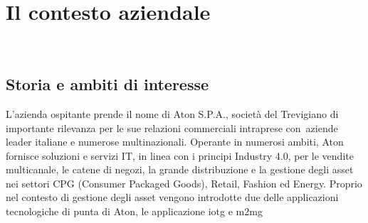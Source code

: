 
\chapter{Il contesto aziendale}
\label{cap:introduzione}

\\





\section{Storia e ambiti di interesse}

L'azienda ospitante prende il nome di Aton S.P.A., società del Trevigiano di importante rilevanza per le sue relazioni commerciali intraprese con\
aziende leader italiane e numerose multinazionali.
Operante in numerosi ambiti, Aton fornisce soluzioni e servizi IT, in linea con i principi Industry 4.0, per le vendite multicanale, le catene di negozi, 
la grande distribuzione e la gestione degli asset nei settori CPG (Consumer Packaged Goods), Retail, Fashion ed Energy.
Proprio nel contesto di gestione degli asset vengono introdotte due delle applicazioni tecnologiche di punta di Aton, le applicazione \gls{iotg} e \gls{m2mg}

